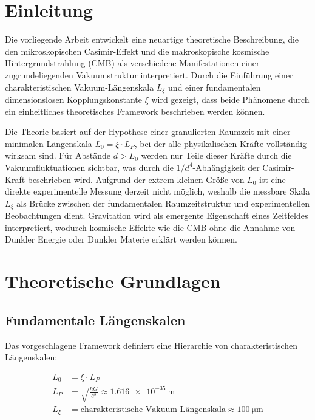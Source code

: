 	\section{Einleitung}
	
	Die vorliegende Arbeit entwickelt eine neuartige theoretische Beschreibung, die den mikroskopischen Casimir-Effekt und die makroskopische kosmische Hintergrundstrahlung (CMB) als verschiedene Manifestationen einer zugrundeliegenden Vakuumstruktur interpretiert. Durch die Einführung einer charakteristischen Vakuum-Längenskala \( L_\xi \) und einer fundamentalen dimensionslosen Kopplungskonstante \( \xi \) wird gezeigt, dass beide Phänomene durch ein einheitliches theoretisches Framework beschrieben werden können.
	
	Die Theorie basiert auf der Hypothese einer granulierten Raumzeit mit einer minimalen Längenskala \( L_0 = \xi \cdot L_P \), bei der alle physikalischen Kräfte vollständig wirksam sind. Für Abstände \( d > L_0 \) werden nur Teile dieser Kräfte durch die Vakuumfluktuationen sichtbar, was durch die \( 1/d^4 \)-Abhängigkeit der Casimir-Kraft beschrieben wird. Aufgrund der extrem kleinen Größe von \( L_0 \) ist eine direkte experimentelle Messung derzeit nicht möglich, weshalb die messbare Skala \( L_\xi \) als Brücke zwischen der fundamentalen Raumzeitstruktur und experimentellen Beobachtungen dient. Gravitation wird als emergente Eigenschaft eines Zeitfeldes interpretiert, wodurch kosmische Effekte wie die CMB ohne die Annahme von Dunkler Energie oder Dunkler Materie erklärt werden können.
	
	\section{Theoretische Grundlagen}
	
	\subsection{Fundamentale Längenskalen}
	
	Das vorgeschlagene Framework definiert eine Hierarchie von charakteristischen Längenskalen:
	
	\begin{align}
		L_0 &= \xi \cdot L_P \label{eq:L0_definition}\\
		L_P &= \sqrt{\frac{\hbar G}{c^3}} \approx \SI{1.616e-35}{\meter} \label{eq:planck_length}\\
		L_\xi &= \text{charakteristische Vakuum-Längenskala} \approx \SI{100}{\micro\meter} \label{eq:Lxi_definition}
	\end{align}
	
